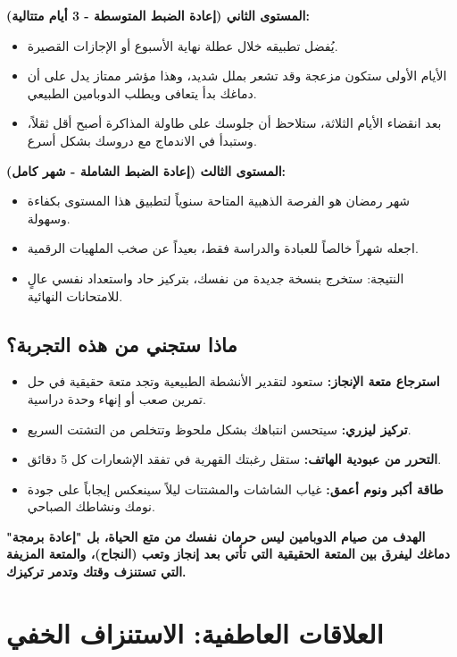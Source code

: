 \documentclass[12pt,a4paper]{book}
\newcommand{\importantAr}[1]{%
	\begin{important}
		\bfseries #1
	\end{important}
}
\begin{document}
	\textbf{المستوى الثاني (إعادة الضبط المتوسطة - 3 أيام متتالية):}
	\begin{itemize}
		\item يُفضل تطبيقه خلال عطلة نهاية الأسبوع أو الإجازات القصيرة.
		\item الأيام الأولى ستكون مزعجة وقد تشعر بملل شديد، وهذا مؤشر ممتاز يدل على أن دماغك بدأ يتعافى ويطلب الدوبامين الطبيعي.
		\item بعد انقضاء الأيام الثلاثة، ستلاحظ أن جلوسك على طاولة المذاكرة أصبح أقل ثقلاً، وستبدأ في الاندماج مع دروسك بشكل أسرع.
	\end{itemize}
	
	\textbf{المستوى الثالث (إعادة الضبط الشاملة - شهر كامل):}
	\begin{itemize}
		\item شهر رمضان هو الفرصة الذهبية المتاحة سنوياً لتطبيق هذا المستوى بكفاءة وسهولة.
		\item اجعله شهراً خالصاً للعبادة والدراسة فقط، بعيداً عن صخب الملهيات الرقمية.
		\item النتيجة: ستخرج بنسخة جديدة من نفسك، بتركيز حاد واستعداد نفسي عالٍ للامتحانات النهائية.
	\end{itemize}
	
	\subsection{ماذا ستجني من هذه التجربة؟}
	\begin{itemize}
		\item \textbf{استرجاع متعة الإنجاز:} ستعود لتقدير الأنشطة الطبيعية وتجد متعة حقيقية في حل تمرين صعب أو إنهاء وحدة دراسية.
		\item \textbf{تركيز ليزري:} سيتحسن انتباهك بشكل ملحوظ وتتخلص من التشتت السريع.
		\item \textbf{التحرر من عبودية الهاتف:} ستقل رغبتك القهرية في تفقد الإشعارات كل 5 دقائق.
		\item \textbf{طاقة أكبر ونوم أعمق:} غياب الشاشات والمشتتات ليلاً سينعكس إيجاباً على جودة نومك ونشاطك الصباحي.
	\end{itemize}
	
	\importantAr{الهدف من صيام الدوبامين ليس حرمان نفسك من متع الحياة، بل "إعادة برمجة" دماغك ليفرق بين المتعة الحقيقية التي تأتي بعد إنجاز وتعب (النجاح)، والمتعة المزيفة التي تستنزف وقتك وتدمر تركيزك.}
	
	\section{العلاقات العاطفية: الاستنزاف الخفي }
	
\end{document}
